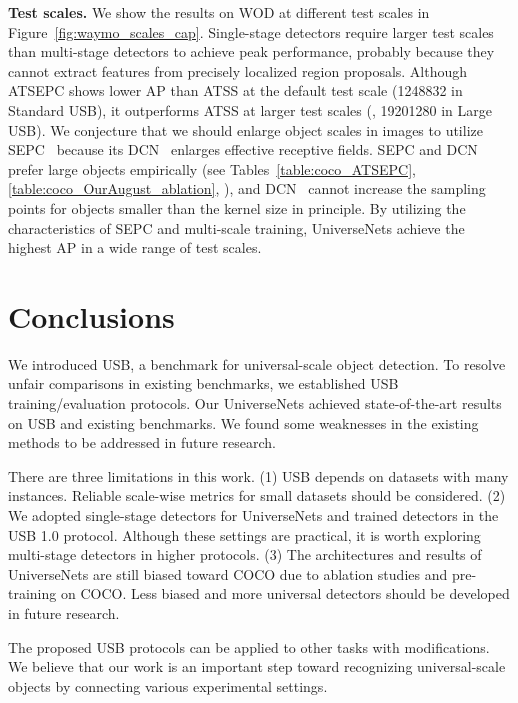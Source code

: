 \documentclass[10pt,twocolumn,letterpaper]{article}
\newcommand{\Univs}{UniverseNets\xspace}
\newcommand{\ATSEPC}{ATSEPC\xspace}
\begin{document}
\textbf{Test scales.}
We show the results on WOD at different test scales in Figure~\ref{fig:waymo_scales_cap}.
Single-stage detectors require larger test scales than multi-stage detectors to achieve peak performance,
probably because they cannot extract features from precisely localized region proposals.
Although \ATSEPC shows lower AP than ATSS at the default test scale (1248832 in Standard USB),
it outperforms ATSS at larger test scales (\eg, 19201280 in Large USB).
We conjecture that we should enlarge object scales in images to utilize SEPC~\cite{SEPC_CVPR2020}
because its DCN~\cite{DCN_ICCV2017} enlarges effective receptive fields.
SEPC and DCN prefer large objects empirically (see Tables~\ref{table:coco_ATSEPC}, \ref{table:coco_OurAugust_ablation}, \cite{SEPC_CVPR2020, DCN_ICCV2017}),
and DCN~\cite{DCN_ICCV2017} cannot increase the sampling points for objects smaller than the kernel size in principle.
By utilizing the characteristics of SEPC and multi-scale training,
UniverseNets achieve the highest AP in a wide range of test scales.







 


\section{Conclusions}

We introduced USB, a benchmark for universal-scale object detection.
To resolve unfair comparisons in existing benchmarks,
we established USB training/evaluation protocols.
Our \Univs achieved state-of-the-art results on USB and existing benchmarks.
We found some weaknesses in the existing methods to be addressed in future research.

There are three limitations in this work.
(1) USB depends on datasets with many instances.
Reliable scale-wise metrics for small datasets should be considered.
(2) We adopted single-stage detectors for \Univs
and trained detectors in the USB 1.0 protocol.
Although these settings are practical,
it is worth exploring multi-stage detectors in higher protocols.
(3) The architectures and results of \Univs are still biased toward COCO
due to ablation studies and pre-training on COCO.
Less biased and more universal detectors should be developed in future research.

The proposed USB protocols can be applied to other tasks with modifications.
We believe that our work is an important step toward recognizing universal-scale objects
by connecting various experimental settings.
 
\end{document}
